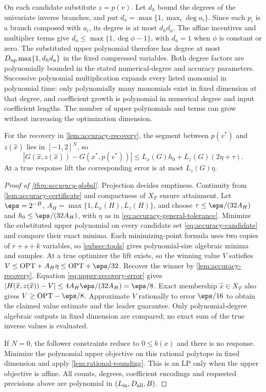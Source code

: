 On each candidate substitute $z=p(v)$. Let $d_h$ bound the degrees
of the univariate inverse branches, and put
$d_a=\max\{1,\max_i\deg a_i\}$. Since each $p_i$ is a branch
composed with $a_i$, its degree is at most $d_h d_a$.
The affine incentives and multiplier terms give
$d_a\le\max\{1,\deg\phi-1\}$, with $d_a=1$ when $\phi$ is
constant or zero. The substituted upper polynomial therefore has degree
at most $D_{\rm up}\max\{1,d_h d_a\}$ in the fixed compressed
variables. Both degree factors are polynomially bounded in the stated
numerical-degree and accuracy parameters.
Successive polynomial multiplication expands every listed monomial in
polynomial time: only polynomially many monomials exist in fixed
dimension at that degree, and coefficient growth is polynomial in
numerical degree and input coefficient lengths. The number of upper
polynomials and terms can grow without increasing the optimization
dimension.

For the recovery in \cref{lem:accuracy-recovery}, the segment between
$p(v^*)$ and $z(\widehat x)$ lies in $[-1,2]^N$, so
\begin{equation}\label{eq:upper-recovery-error}
 |G(\widehat x,z(\widehat x))-G(x^*,p(v^*))|
 \le L_x(G)h_0+L_z(G)(2\eta+\tau).
\end{equation}
At a true response lift the corresponding error is at most $L_z(G)\eta$.

\begin{proof}[Proof of \cref{thm:accuracy-global}]
Projection decides emptiness. Continuity from
\cref{lem:accuracy-certificate} and compactness of $X_F$ ensure
attainment. Let $\eps=2^{-B}$,
$A_H=\max\{1,L_x(H),L_z(H)\}$, and choose
$\tau\le\eps/(32A_H)$ and $h_0\le\eps/(32A_H)$, with
$\eta$ as in \eqref{eq:accuracy-general-tolerance}.
Minimize the substituted upper polynomial on every candidate set
\eqref{eq:accuracy-candidate} and compare their exact minima.
Each minimizing-point formula uses two copies of $r+s+k$ variables,
so \cref{subsec:tools} gives polynomial-size algebraic minima
and samples. At a true optimizer the lift exists, so the winning
value $V$ satisfies $V\le\mathrm{OPT}+A_H\eta\le\mathrm{OPT}+\eps/32$.
Recover the winner by \cref{lem:accuracy-recovery}.
Equation \eqref{eq:upper-recovery-error} gives
$|H(\widehat x,z(\widehat x))-V|\le4A_H\eps/(32A_H)=\eps/8$.
Exact membership $\widehat x\in X_F$ also gives
$V\ge\mathrm{OPT}-\eps/8$. Approximate $V$ rationally to error
$\eps/16$ to obtain the claimed value estimate and the leader guarantee.
Only polynomial-degree algebraic outputs in fixed dimension are compared;
no exact sum of the true inverse values is evaluated.

If $N=0$, the follower constraints reduce to $0\le b(x)$ and there
is no response. Minimize the polynomial upper objective on this rational
polytope in fixed dimension and apply \cref{lem:rational-rounding}.
This is an LP only when the upper objective is affine. All counts,
degrees, coefficient encodings and requested precisions above are
polynomial in $(L_{\rm in},D_{\rm all},B)$.
\end{proof}

